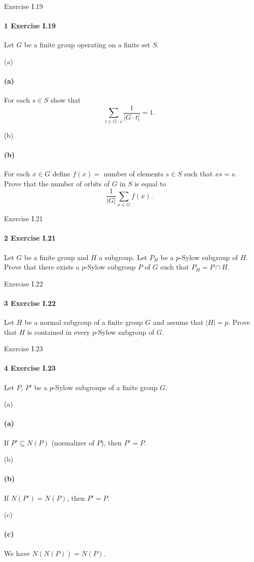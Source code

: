 \documentclass[12pt]{article}
\newlength{\myparskip}
\newenvironment{fullbox}{\begin{lrbox}{\savefullbox}\begin{minipage}{\dimexpr\textwidth-2\fboxsep\relax}\setlength{\parskip}{\myparskip}}{\end{minipage}\end{lrbox}\framebox[\textwidth]{\usebox{\savefullbox}}}
\newenvironment{pbox}[1][]{\begin{fullbox}\ifx#1\empty\else\paragraph{#1}\fi}{\end{fullbox}}
\newcommand{\<}{\langle}
\renewcommand{\>}{\rangle}
\begin{document}
\thispagestyle{title}


\begin{pbox}[1 Exercise I.19]
    Let $G$ be a finite group operating on a finite set $S$.
\end{pbox}

\begin{pbox}[(a)]
    For each $s \in S$ show that
    \[
        \sum_{t \in G \cdot s} \frac{1}{|G \cdot t|} = 1.
    \]
\end{pbox}

\begin{pbox}[(b)]
    For each $x \in G$ define $f(x) = $ number of elements $s \in S$ such that $xs = s$. Prove that the number of orbits of $G$ in $S$ is equal to
    \[
        \frac{1}{|G|}\sum_{x \in G} f(x).
    \]
\end{pbox}

\begin{pbox}[2 Exercise I.21]
    Let $G$ be a finite group and $H$ a subgroup. Let $P_H$ be a $p$-Sylow subgroup of $H$. Prove that there exists a $p$-Sylow subgroup $P$ of $G$ such that $P_H = P \cap H$.
\end{pbox}

\begin{pbox}[3 Exercise I.22]
    Let $H$ be a normal subgroup of a finite group $G$ and assume that $|H| = p$. Prove that $H$ is contained in every $p$-Sylow subgroup of $G$.
\end{pbox}

\begin{pbox}[4 Exercise I.23]
    Let $P$, $P'$ be a $p$-Sylow subgroups of a finite group $G$.
\end{pbox}

\begin{pbox}[(a)]
    If $P' \subseteq N(P)$ (normalizer of $P$), then $P' = P$.
\end{pbox}

\begin{pbox}[(b)]
    If $N(P') = N(P)$, then $P' = P$.
\end{pbox}

\begin{pbox}[(c)]
    We have $N(N(P)) = N(P)$.
\end{pbox}
\end{document}
